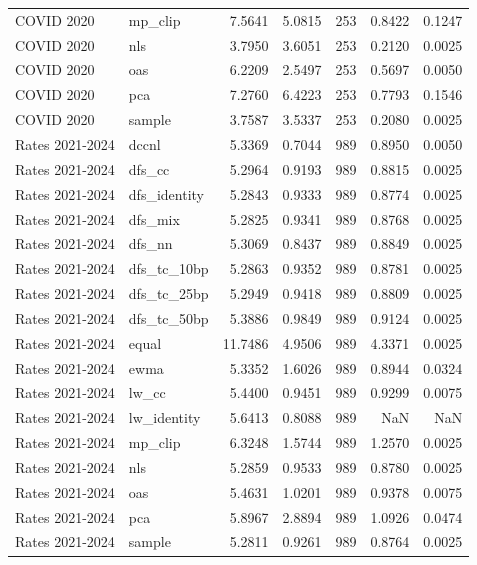 \begin{tabular}{llrrrrr}
COVID 2020 & mp_clip & 7.5641 & 5.0815 & 253 & 0.8422 & 0.1247 \\
COVID 2020 & nls & 3.7950 & 3.6051 & 253 & 0.2120 & 0.0025 \\
COVID 2020 & oas & 6.2209 & 2.5497 & 253 & 0.5697 & 0.0050 \\
COVID 2020 & pca & 7.2760 & 6.4223 & 253 & 0.7793 & 0.1546 \\
COVID 2020 & sample & 3.7587 & 3.5337 & 253 & 0.2080 & 0.0025 \\
Rates 2021-2024 & dccnl & 5.3369 & 0.7044 & 989 & 0.8950 & 0.0050 \\
Rates 2021-2024 & dfs_cc & 5.2964 & 0.9193 & 989 & 0.8815 & 0.0025 \\
Rates 2021-2024 & dfs_identity & 5.2843 & 0.9333 & 989 & 0.8774 & 0.0025 \\
Rates 2021-2024 & dfs_mix & 5.2825 & 0.9341 & 989 & 0.8768 & 0.0025 \\
Rates 2021-2024 & dfs_nn & 5.3069 & 0.8437 & 989 & 0.8849 & 0.0025 \\
Rates 2021-2024 & dfs_tc_10bp & 5.2863 & 0.9352 & 989 & 0.8781 & 0.0025 \\
Rates 2021-2024 & dfs_tc_25bp & 5.2949 & 0.9418 & 989 & 0.8809 & 0.0025 \\
Rates 2021-2024 & dfs_tc_50bp & 5.3886 & 0.9849 & 989 & 0.9124 & 0.0025 \\
Rates 2021-2024 & equal & 11.7486 & 4.9506 & 989 & 4.3371 & 0.0025 \\
Rates 2021-2024 & ewma & 5.3352 & 1.6026 & 989 & 0.8944 & 0.0324 \\
Rates 2021-2024 & lw_cc & 5.4400 & 0.9451 & 989 & 0.9299 & 0.0075 \\
Rates 2021-2024 & lw_identity & 5.6413 & 0.8088 & 989 & NaN & NaN \\
Rates 2021-2024 & mp_clip & 6.3248 & 1.5744 & 989 & 1.2570 & 0.0025 \\
Rates 2021-2024 & nls & 5.2859 & 0.9533 & 989 & 0.8780 & 0.0025 \\
Rates 2021-2024 & oas & 5.4631 & 1.0201 & 989 & 0.9378 & 0.0075 \\
Rates 2021-2024 & pca & 5.8967 & 2.8894 & 989 & 1.0926 & 0.0474 \\
Rates 2021-2024 & sample & 5.2811 & 0.9261 & 989 & 0.8764 & 0.0025 \\
\bottomrule
\end{tabular}
